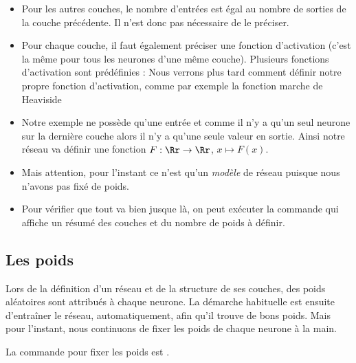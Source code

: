 \documentclass[11pt,class=report,crop=false]{standalone}
\begin{document}
\begin{itemize}

  \item Pour les autres couches, le nombre d'entrées est égal au nombre de sorties de la couche précédente. Il n'est donc pas nécessaire de le préciser.
  
  \item Pour chaque couche, il faut également préciser une fonction d'activation (c'est la même pour tous les neurones d'une même couche). Plusieurs fonctions d'activation sont prédéfinies :
  Nous verrons plus tard comment définir notre propre fonction d'activation, comme par exemple la fonction marche de Heaviside
  
  \item Notre exemple ne possède qu'une entrée et comme il n'y a qu'un seul neurone sur la dernière couche alors il n'y a qu'une seule valeur en sortie. Ainsi notre réseau va définir une fonction $F : \Rr \to \Rr$, $x \mapsto F(x)$.
  
  \item Mais attention, pour l'instant ce n'est qu'un \emph{modèle} de réseau puisque nous n'avons pas fixé de poids. 


  
  \item Pour vérifier que tout va bien jusque là, on peut exécuter la commande 
  qui affiche un résumé des couches et du nombre de poids à définir.
  
\end{itemize}


\subsection{Les poids}

Lors de la définition d'un réseau et de la structure de ses couches, des poids aléatoires sont attribués à chaque neurone. 
La démarche habituelle est ensuite d'entraîner le réseau, automatiquement, afin qu'il trouve de \og{}bons\fg{} poids. Mais pour l'instant, nous continuons de fixer les poids de chaque neurone à la main. 

La commande pour fixer les poids est . 
\end{document}
